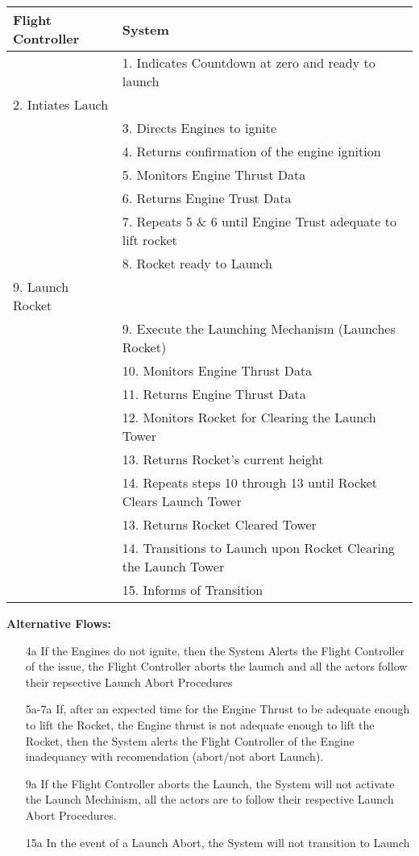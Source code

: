 \documentclass[letterpaper]{article}
\begin{document}
\begin{tabular}{|p{5.75cm}|p{5.75cm}|}\hline
\textbf{Flight Controller} & \textbf{System}\\\hline
&1.  Indicates Countdown at zero and ready to launch\\\hline
2. Intiates Lauch & \\\hline
& 3.  Directs Engines to ignite\\\hline
& 4.  Returns confirmation of the engine ignition\\\hline
& 5.  Monitors Engine Thrust Data\\\hline
& 6.  Returns Engine Trust Data\\\hline
& 7.  Repeats 5 \& 6 until Engine Trust adequate to lift
rocket\\\hline
& 8.  Rocket ready to Launch\\\hline
9. Launch Rocket &\\\hline
& 9.   Execute the Launching Mechanism (Launches Rocket)\\\hline
& 10.  Monitors Engine Thrust Data\\\hline
& 11.  Returns Engine Thrust Data\\\hline
& 12.  Monitors Rocket for Clearing the Launch Tower\\\hline
& 13.  Returns Rocket's current height\\\hline
& 14.  Repeats steps 10 through 13 until Rocket Clears Launch
Tower\\\hline
& 13.  Returns Rocket Cleared Tower\\\hline
& 14.  Transitions to Launch upon Rocket Clearing the Launch
Tower\\\hline
& 15.  Informs of Transition\\\hline 
\end{tabular}
\textbf{Alternative Flows:}
\begin{itemize}
\item[4a]If the Engines do not ignite, then the System Alerts the
Flight Controller of the issue, the Flight Controller aborts the
laumch and all the actors follow their repsective Launch Abort
Procedures
\item[5a-7a]If, after an expected time for the Engine Thrust to be
adequate enough to lift the Rocket, the Engine thrust is not adequate
enough to lift the Rocket, then the System alerts the Flight Controller
of the Engine inadequancy with recomendation (abort/not abort Launch).
\item[9a]If the Flight Controller aborts the Launch, the
System will not activate the Launch Mechinism, all the actors are to
follow their respective Launch Abort Procedures.
\item[15a]In the event of a Launch Abort, the System will not
transition to Launch
\end{itemize}
\end{document}
